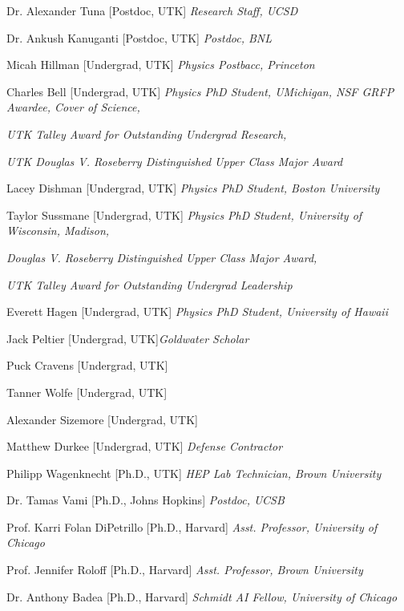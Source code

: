 \documentclass[11pt,letterpaper]{article}
\begin{document}
    \begin{itemizetighter}
      \item Dr. Alexander Tuna [Postdoc, UTK] \hfill \emph{Research Staff, UCSD}
      \item Dr. Ankush Kanuganti [Postdoc, UTK] \hfill \emph{Postdoc, BNL}
      \item Micah Hillman [Undergrad, UTK] \hfill \emph{Physics Postbacc, Princeton}
      \item Charles Bell [Undergrad, UTK] \hfill \emph{Physics PhD Student, UMichigan, NSF GRFP Awardee, Cover of Science,}
        \item \hfill \emph{UTK Talley Award for Outstanding Undergrad Research,}
        \item \hfill \emph{UTK Douglas V. Roseberry Distinguished Upper Class Major Award}
      \item Lacey Dishman [Undergrad, UTK] \hfill \emph{Physics PhD Student, Boston University}
      \item Taylor Sussmane [Undergrad, UTK] \hfill \emph{Physics PhD Student, University of Wisconsin, Madison,}
        \item \hfill \emph{Douglas V. Roseberry Distinguished Upper Class Major Award,}
        \item \hfill \emph{UTK Talley Award for Outstanding Undergrad Leadership}
      \item Everett Hagen [Undergrad, UTK] \hfill \emph{Physics PhD Student, University of Hawaii}
      \item Jack Peltier [Undergrad, UTK]\hfill \emph{Goldwater Scholar}
      \item Puck Cravens [Undergrad, UTK]
      \item Tanner Wolfe [Undergrad, UTK]
      \item Alexander Sizemore [Undergrad, UTK]
      \item Matthew Durkee [Undergrad, UTK] \hfill \emph{Defense Contractor}
      \item Philipp Wagenknecht [Ph.D., UTK] \hfill \emph{HEP Lab Technician, Brown University}
      \item Dr. Tamas Vami [Ph.D., Johns Hopkins] \hfill \emph{Postdoc, UCSB}
      \item Prof. Karri Folan DiPetrillo [Ph.D., Harvard] \hfill \emph{Asst. Professor, University of Chicago}
      \item Prof. Jennifer Roloff [Ph.D., Harvard] \hfill \emph{Asst. Professor, Brown University}
      \item Dr. Anthony Badea [Ph.D., Harvard] \hfill \emph{Schmidt AI Fellow, University of Chicago}

\end{itemizetighter}
\end{document}
